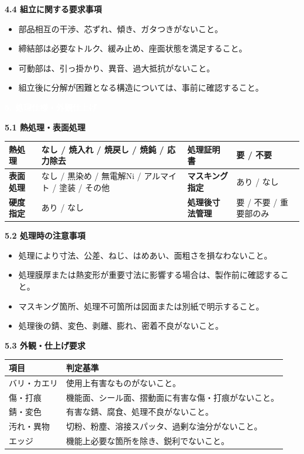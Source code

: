 \documentclass[a4paper,10pt]{ltjsarticle}
\makeatletter
\newlength{\SpecBodyWidth}
\newcommand{\PageTitle}[1]{%
  \vspace*{2mm}%
  \noindent\colorbox{SpecHead}{%
    \parbox{\dimexpr\SpecBodyWidth-2\fboxsep\relax}{%
      \large\bfseries\textcolor{white}{#1}%
    }%
  }%
  \par\vspace{5mm}%
}
\newcommand{\BlockTitle}[1]{%
  \vspace{4mm}%
  \noindent\colorbox{SpecSoft}{%
    \parbox{\dimexpr\SpecBodyWidth-2\fboxsep\relax}{%
      \normalsize\bfseries\textcolor{SpecHead}{#1}%
    }%
  }%
  \par\vspace{1.5mm}%
}
\newenvironment{SpecTable}[1]{%
  \par\vspace{1mm}%
  \noindent\footnotesize%
  \renewcommand{\arraystretch}{1.10}%
  \setlength{\tabcolsep}{3.0pt}%
  \begin{tabular*}{\SpecBodyWidth}{@{\extracolsep{\fill}}#1@{}}%
}{%
  \end{tabular*}%
  \par\vspace{1.5mm}%
}
\newcommand{\Head}[1]{\textbf{\textcolor{SpecHead}{#1}}}
\newcommand{\Lab}[1]{\textbf{\textcolor{SpecHead}{#1}}}
\newcommand{\YN}{要 / 不要}
\makeatother
\begin{document}
\BlockTitle{4.4 組立に関する要求事項}
\begin{itemize}
  \item 部品相互の干渉、芯ずれ、傾き、ガタつきがないこと。
  \item 締結部は必要なトルク、緩み止め、座面状態を満足すること。
  \item 可動部は、引っ掛かり、異音、過大抵抗がないこと。
  \item 組立後に分解が困難となる構造については、事前に確認すること。
\end{itemize}

\clearpage

\PageTitle{5. 処理仕様・外観仕上げ}

\BlockTitle{5.1 熱処理・表面処理}
\begin{SpecTable}{|p{28mm}|p{43mm}|p{30mm}|p{43mm}|}
\hline
\Lab{熱処理} & なし / 焼入れ / 焼戻し / 焼鈍 / 応力除去 & \Lab{処理証明書} & \YN \\
\hline
\Lab{表面処理} & なし / 黒染め / 無電解Ni / アルマイト / 塗装 / その他 & \Lab{マスキング指定} & あり / なし \\
\hline
\Lab{硬度指定} & あり / なし & \Lab{処理後寸法管理} & 要 / 不要 / 重要部のみ \\
\hline
\end{SpecTable}

\BlockTitle{5.2 処理時の注意事項}
\begin{itemize}
  \item 処理により寸法、公差、ねじ、はめあい、面粗さを損なわないこと。
  \item 処理膜厚または熱変形が重要寸法に影響する場合は、製作前に確認すること。
  \item マスキング箇所、処理不可箇所は図面または別紙で明示すること。
  \item 処理後の錆、変色、剥離、膨れ、密着不良がないこと。
\end{itemize}

\BlockTitle{5.3 外観・仕上げ要求}
\begin{SpecTable}{|p{34mm}|p{112mm}|}
\hline
\Head{項目} & \Head{判定基準} \\
\hline
バリ・カエリ & 使用上有害なものがないこと。 \\
\hline
傷・打痕 & 機能面、シール面、摺動面に有害な傷・打痕がないこと。 \\
\hline
錆・変色 & 有害な錆、腐食、処理不良がないこと。 \\
\hline
汚れ・異物 & 切粉、粉塵、溶接スパッタ、過剰な油分がないこと。 \\
\hline
エッジ & 機能上必要な箇所を除き、鋭利でないこと。 \\
\hline
\end{SpecTable}
\end{document}
